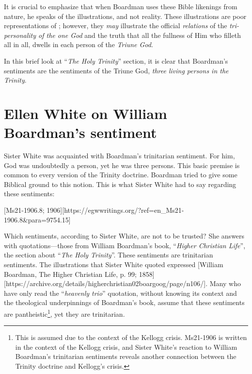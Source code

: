 It is crucial to emphasize that when Boardman uses these Bible likenings from nature, he speaks of the illustrations, and not reality. These illustrations are poor representations of ; however, they \textit{may }illustrate the official \textit{relations }of the \textit{tri-personality of the one God} and the truth that all the fullness of Him who filleth all in all, dwells in each person of the \textit{Triune God}.

In this brief look at “\textit{The Holy Trinity}” section, it is clear that Boardman’s sentiments are the sentiments of the Triune God, \textit{three living persons in the Trinity}.

\section*{Ellen White on William Boardman’s sentiment}

Sister White was acquainted with Boardman’s trinitarian sentiment. For him, God was undoubtedly a person, yet he was three persons. This basic premise is common to every version of the Trinity doctrine. Boardman tried to give some Biblical ground to this notion. This is what Sister White had to say regarding these sentiments:

[Ms21-1906.8; 1906][https://egwwritings.org/?ref=en\_Ms21-1906.8&para=9754.15]

Which sentiments, according to Sister White, are not to be trusted? She answers with quotations—those from William Boardman’s book, “\textit{Higher Christian Life}”, the section about “\textit{The Holy Trinity}”. These sentiments are trinitarian sentiments. The illustrations that Sister White quoted expressed [William Boardman, The Higher Christian Life, p. 99; 1858][https://archive.org/details/higherchristian02boargoog/page/n106/]. Many who have only read the “\textit{heavenly trio}” quotation, without knowing its context and the theological underpinnings of Boardman’s book, assume that these sentiments are pantheistic\footnote{This is assumed due to the context of the Kellogg crisis. Ms21-1906 is written in the context of the Kellogg crisis, and Sister White’s reaction to William Boardman’s trinitarian sentiments reveals another connection between the Trinity doctrine and Kellogg’s crisis.}, yet they are trinitarian.

